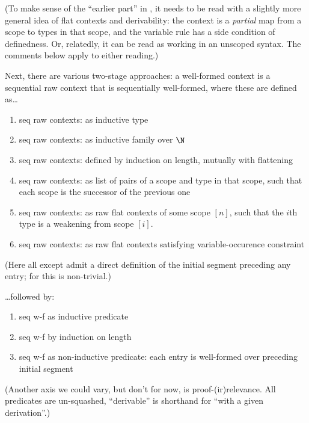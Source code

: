 (To make sense of the “earlier part” in , it needs to be read with  a slightly more general idea of flat contexts and derivability: the context is a \emph{partial} map from a scope to types in that scope, and the variable rule has a side condition of definedness.  Or, relatedly, it can be read as working in an unscoped syntax.  The comments below apply to either reading.)

Next, there are various two-stage approaches: a well-formed context is a sequential raw context that is sequentially well-formed, where these are defined as…

\begin{enumerate} \restoreitem
\item seq raw contexts: as inductive type 
\item seq raw contexts: as inductive family over $\N$ 
\item seq raw contexts: defined by induction on length, mutually with flattening 
\item seq raw contexts: as list of pairs of a scope and type in that scope, such that each scope is the successor of the previous one 
\item seq raw contexts: as raw flat contexts of some scope $[n]$, such that the $i$th type is a weakening from scope $[i]$.  
\item seq raw contexts: as raw flat contexts satisfying variable-occurence constraint 
\end{enumerate}
(Here all except  admit a direct definition of the initial segment preceding any entry; for  this is non-trivial.)

…followed by:
\begin{enumerate}
\item seq w-f as inductive predicate 
\item seq w-f by induction on length 
\item seq w-f as non-inductive predicate: each entry is well-formed over preceding initial segment 
\end{enumerate}

(Another axis we could vary, but don’t for now, is proof-(ir)relevance.  All predicates are un-squashed, “derivable” is shorthand for “with a given derivation”.)

